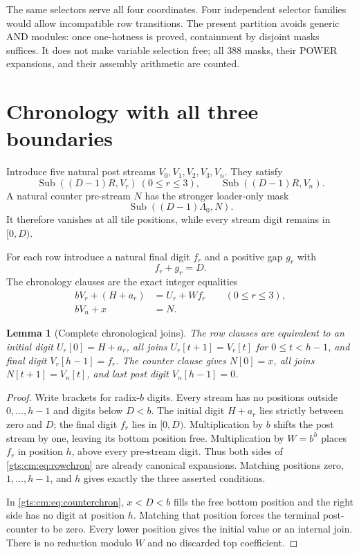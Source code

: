 \documentclass[11pt,letterpaper]{article}
\newtheorem{lemma}[theorem]{Lemma}
\theoremstyle{definition}
\theoremstyle{remark}
\newcommand{\Sub}{\operatorname{Sub}}
\begin{document}
The same selectors serve all four coordinates. Four independent selector families would allow incompatible row transitions. The present partition avoids generic AND modules: once one-hotness is proved, containment by disjoint masks suffices. It does not make variable selection free; all 388 masks, their POWER expansions, and their assembly arithmetic are counted.

\section{Chronology with all three boundaries}
\label{gts:cm:sec:chronology}
Introduce five natural post streams $V_0,V_1,V_2,V_3,V_n$. They satisfy
\begin{equation}\label{gts:cm:eq:postmask}
 \Sub((D-1)R,V_r)\ (0\le r\le3),\qquad
 \Sub((D-1)R,V_n).
\end{equation}
A natural counter pre-stream $N$ has the stronger loader-only mask
\begin{equation}\label{gts:cm:eq:countermask}
 \Sub((D-1)\Lambda_0,N).
\end{equation}
It therefore vanishes at all tile positions, while every stream digit remains in $[0,D)$.

For each row introduce a natural final digit $f_r$ and a positive gap $g_r$ with
\begin{equation}\label{gts:cm:eq:finalbound}
 f_r+g_r=D.
\end{equation}
The chronology clauses are the exact integer equalities
\begin{align}
 bV_r+(H+a_r)&=U_r+Wf_r\qquad(0\le r\le3),\label{gts:cm:eq:rowchron}\\
 bV_n+x&=N.\label{gts:cm:eq:counterchron}
\end{align}

\begin{lemma}[Complete chronological joins]\label{gts:cm:lem:chronology}
The row clauses are equivalent to an initial digit $U_r[0]=H+a_r$, all joins $U_r[t+1]=V_r[t]$ for $0\le t<h-1$, and final digit $V_r[h-1]=f_r$. The counter clause gives $N[0]=x$, all joins $N[t+1]=V_n[t]$, and last post digit $V_n[h-1]=0$.
\end{lemma}
\begin{proof}
Write brackets for radix-$b$ digits. Every stream has no positions outside $0,\ldots,h-1$ and digits below $D<b$. The initial digit $H+a_r$ lies strictly between zero and $D$; the final digit $f_r$ lies in $[0,D)$. Multiplication by $b$ shifts the post stream by one, leaving its bottom position free. Multiplication by $W=b^h$ places $f_r$ in position $h$, above every pre-stream digit. Thus both sides of \eqref{gts:cm:eq:rowchron} are already canonical expansions. Matching positions zero, $1,\ldots,h-1$, and $h$ gives exactly the three asserted conditions.

In \eqref{gts:cm:eq:counterchron}, $x<D<b$ fills the free bottom position and the right side has no digit at position $h$. Matching that position forces the terminal post-counter to be zero. Every lower position gives the initial value or an internal join. There is no reduction modulo $W$ and no discarded top coefficient.
\end{proof}
\end{document}

